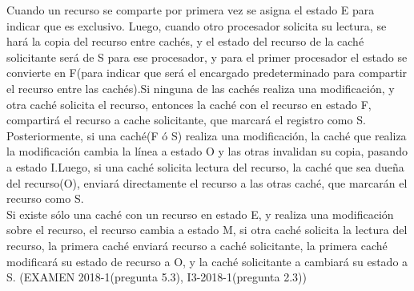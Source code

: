 \documentclass[letter]{article}
\begin{document}
	\begin{pregunta}{5}
	
	
Cuando un recurso se comparte por primera vez se asigna el estado E para indicar que es exclusivo.
Luego, cuando otro procesador solicita su lectura, se hará la copia del recurso entre cachés, y el estado del recurso de la caché solicitante será de S para ese procesador, y para el primer procesador el estado se convierte en F(para indicar que será el encargado predeterminado para compartir el recurso entre las cachés).Si ninguna de las cachés realiza una modificación, y otra caché solicita el recurso, entonces la caché con el recurso en estado F, compartirá el recurso a cache solicitante, que marcará el registro como S. Posteriormente, si una caché(F ó S) realiza una modificación, la caché que realiza la modificación cambia la línea a estado O y las otras invalidan su copia, pasando a estado I.Luego, si una caché solicita lectura del recurso, la caché que sea dueña del recurso(O), enviará directamente el recurso a las otras caché, que marcarán el recurso como S. 
$$ $$
Si existe sólo una caché con un recurso en estado E, y realiza una modificación sobre el recurso, el recurso cambia a estado M, si otra caché solicita la lectura del recurso, la primera caché enviará recurso a caché solicitante, la primera caché modificará su estado de recurso a O, y la caché solicitante a cambiará su estado a S. (EXAMEN 2018-1(pregunta 5.3), I3-2018-1(pregunta 2.3))



	\end{pregunta}
\end{document}
